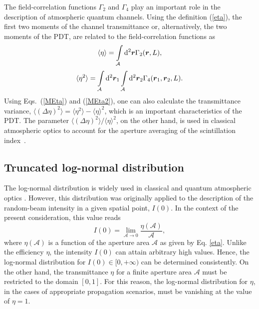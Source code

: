 \documentclass[aps,pra,twocolumn,a4paper,nofootinbib,preprintnumbers] {revtex4-1}
\newcommand{\D}{{\rm{d}}}
\begin{document}
	The field-correlation functions $\Gamma_2$ and $\Gamma_4$ play an important role in the description of atmospheric  quantum channels.
	Using the definition (\ref{eta}), the first two moments  of the  channel transmittance or, alternatively, the two moments of the PDT, are related to the field-correlation functions as
		\begin{align}\label{MEta}
		\langle\eta\rangle=\int\limits_{\mathcal{A}}\D^2\boldsymbol{r} \Gamma_2(\boldsymbol{r},L),
		\end{align}
		\begin{align}\label{MEta2}
		\langle\eta^2\rangle=\int\limits_{\mathcal{A}}\D^2\boldsymbol{r}_1 \int\limits_{\mathcal{A}}\D^2\boldsymbol{r}_2 \Gamma_4(\boldsymbol{r}_1,\boldsymbol{r}_2,L).
		\end{align}
	Using Eqs.~(\ref{MEta}) and (\ref{MEta2}), one can also calculate the transmittance variance,  $\langle(\Delta\eta)^2\rangle{=} \langle\eta^2\rangle- \langle\eta\rangle^2$, which is an important characteristics of the PDT.
	The parameter $\langle(\Delta\eta)^2\rangle/\langle\eta\rangle^2$, on the other hand, is used in classical atmospheric optics to account for the aperture averaging of the scintillation index~\cite{Tatarskii, Yura1983}.

\subsection{Truncated log-normal distribution}\label{sec:truncated}


	The log-normal distribution is widely used in classical and quantum atmospheric optics \cite{Diament1970,Perina1972,Perina1973,Milonni, Tatarskii, Bohmann2017}.
	However, this distribution was originally applied to the description of the random-beam intensity in a given spatial point, $I(0)$.
	In the context of the present consideration, this value reads 
		\begin{equation}
		 I(0)=\lim_{\mathcal{A}\rightarrow 0} \frac{\eta(\mathcal{A})}{\mathcal{A}},
		\end{equation}
	where $\eta(\mathcal{A})$ is a function of the aperture area $\mathcal{A}$ as given by Eq. \eqref{eta}.
	Unlike the efficiency $\eta$, the intensity $I(0)$ can attain arbitrary high values.
	Hence, the log-normal distribution for $I(0)\in[0,+\infty)$   can be determined consistently.
	On the other hand, the transmittance $\eta$ for a finite aperture area $\mathcal{A}$ must be restricted to the domain $[0,1]$.
	For this reason, the log-normal distribution for $\eta$, in the cases of appropriate propagation scenarios, must be vanishing at the value of $\eta{=}1$.
\end{document}
